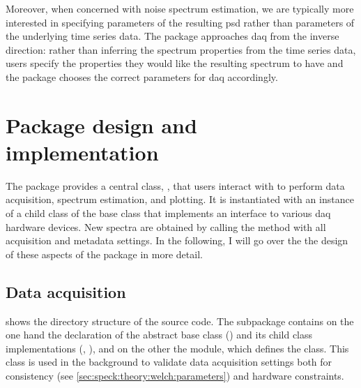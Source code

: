 Moreover, when concerned with noise spectrum estimation, we are typically more interested in specifying parameters of the resulting \gls{psd} rather than parameters of the underlying time series data.
The package approaches \acrlong{daq} from the inverse direction: rather than inferring the spectrum properties from the time series data, users specify the properties they would like the resulting spectrum to have and the package chooses the correct parameters for \acrlong{daq} accordingly.

\section{Package design and implementation}\label{sec:speck:software:design}
\begin{marginfigure}[*-10]
    
    \caption[]{
        Source tree structure of the \pyspeck package.
        Driver wrappers are placed in the  subpackage.
         exports the  class.
    }
    \label{fig:speck:software:tree}
\end{marginfigure}
The \pyspeck package provides a central class, , that users interact with to perform data acquisition, spectrum estimation, and plotting.
It is instantiated with an instance of a child class of the  base class that implements an interface to various \gls{daq} hardware devices.
New spectra are obtained by calling the  method with all acquisition and metadata settings.
In the following, I will go over the the design of these aspects of the package in more detail.

\subsection{Data acquisition}\label{subsec:speck:software:design:daq}
 shows the directory structure of the source code.
The  subpackage contains on the one hand the declaration of the  abstract base class () and its child class implementations (, \etc), and on the other the  module, which defines the  class.
This class is used in the background to validate data acquisition settings both for consistency (see \cref{sec:speck:theory:welch:parameters}) and hardware constraints.


